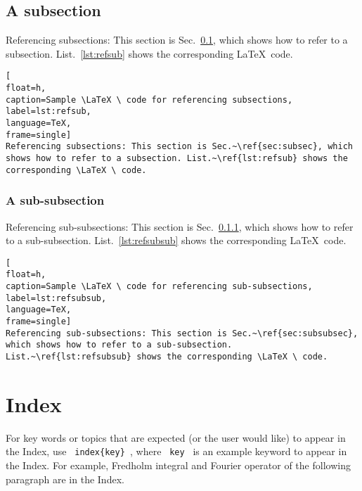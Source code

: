 \subsection{A subsection}
\label{sec:subsec}

Referencing subsections: This section is Sec.~\ref{sec:subsec}, which shows how to refer to a subsection. List.~\ref{lst:refsub} shows the corresponding \LaTeX \ code. 

\begin{lstlisting}[
float=h,
caption=Sample \LaTeX \ code for referencing subsections, 
label=lst:refsub,
language=TeX,
frame=single]
Referencing subsections: This section is Sec.~\ref{sec:subsec}, which shows how to refer to a subsection. List.~\ref{lst:refsub} shows the corresponding \LaTeX \ code. 
\end{lstlisting} 
\blindtext
\cleardoublepage





\subsubsection{A sub-subsection}
\label{sec:subsubsec}


Referencing sub-subsections: This section is Sec.~\ref{sec:subsubsec}, which shows how to refer to a sub-subsection.  List.~\ref{lst:refsubsub} shows the corresponding \LaTeX \ code. 

\begin{lstlisting}[
float=h,
caption=Sample \LaTeX \ code for referencing sub-subsections, 
label=lst:refsubsub,
language=TeX,
frame=single]
Referencing sub-subsections: This section is Sec.~\ref{sec:subsubsec}, which shows how to refer to a sub-subsection. List.~\ref{lst:refsubsub} shows the corresponding \LaTeX \ code. 
\end{lstlisting}

\blindtext
\cleardoublepage







\newpage
\section{Index}

For key words or topics that are expected (or the user would like) to appear in the Index, use \verb| index{key} |, where  \verb| key | is an example keyword to appear in the Index. For example, Fredholm integral and Fourier operator of the following paragraph are in the Index. 

